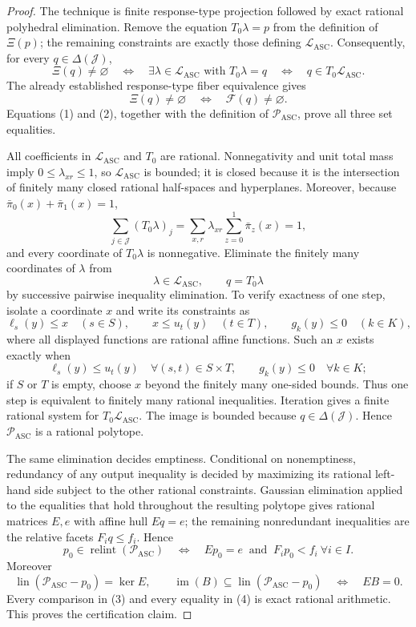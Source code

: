 \documentclass{article}
\begin{document}
\begin{proof}
The technique is finite response-type projection followed by exact rational polyhedral elimination.  Remove the equation \(T_0\lambda=p\) from the definition of \(\Xi(p)\); the remaining constraints are exactly those defining \(\mathcal L_{\mathrm{ASC}}\).  Consequently, for every \(q\in\Delta(\mathcal J)\),
\[
 \Xi(q)\ne\varnothing
 \quad\Longleftrightarrow\quad
 \exists\lambda\in\mathcal L_{\mathrm{ASC}}\text{ with }T_0\lambda=q
 \quad\Longleftrightarrow\quad
 q\in T_0\mathcal L_{\mathrm{ASC}}. \tag{1}
\]
The already established response-type fiber equivalence gives
\[
 \Xi(q)\ne\varnothing
 \quad\Longleftrightarrow\quad
 \mathcal F(q)\ne\varnothing. \tag{2}
\]
Equations (1) and (2), together with the definition of \(\mathcal P_{\mathrm{ASC}}\), prove all three set equalities.

All coefficients in \(\mathcal L_{\mathrm{ASC}}\) and \(T_0\) are rational.  Nonnegativity and unit total mass imply \(0\le\lambda_{xr}\le1\), so \(\mathcal L_{\mathrm{ASC}}\) is bounded; it is closed because it is the intersection of finitely many closed rational half-spaces and hyperplanes.  Moreover, because \(\bar\pi_0(x)+\bar\pi_1(x)=1\),
\[
 \sum_{j\in\mathcal J}(T_0\lambda)_j
 =\sum_{x,r}\lambda_{xr}\sum_{z=0}^1\bar\pi_z(x)=1,
\]
and every coordinate of \(T_0\lambda\) is nonnegative.  Eliminate the finitely many coordinates of \(\lambda\) from
\[
 \lambda\in\mathcal L_{\mathrm{ASC}},\qquad q=T_0\lambda
\]
by successive pairwise inequality elimination.  To verify exactness of one step, isolate a coordinate \(x\) and write its constraints as
\[
 \ell_s(y)\le x\quad(s\in S),\qquad
 x\le u_t(y)\quad(t\in T),\qquad
 g_k(y)\le0\quad(k\in K),
\]
where all displayed functions are rational affine functions.  Such an \(x\) exists exactly when
\[
 \ell_s(y)\le u_t(y)\quad\forall(s,t)\in S\times T,
 \qquad g_k(y)\le0\quad\forall k\in K;
\]
if \(S\) or \(T\) is empty, choose \(x\) beyond the finitely many one-sided bounds.  Thus one step is equivalent to finitely many rational inequalities.  Iteration gives a finite rational system for \(T_0\mathcal L_{\mathrm{ASC}}\).  The image is bounded because \(q\in\Delta(\mathcal J)\).  Hence \(\mathcal P_{\mathrm{ASC}}\) is a rational polytope.

The same elimination decides emptiness.  Conditional on nonemptiness, redundancy of any output inequality is decided by maximizing its rational left-hand side subject to the other rational constraints.  Gaussian elimination applied to the equalities that hold throughout the resulting polytope gives rational matrices \(E,e\) with affine hull \(Eq=e\); the remaining nonredundant inequalities are the relative facets \(F_iq\le f_i\).  Hence
\[
 p_0\in\operatorname{relint}(\mathcal P_{\mathrm{ASC}})
 \quad\Longleftrightarrow\quad
 Ep_0=e\ \text{ and }\ F_ip_0<f_i\ \forall i\in I. \tag{3}
\]
Moreover
\[
 \operatorname{lin}(\mathcal P_{\mathrm{ASC}}-p_0)=\ker E,
 \qquad
 \operatorname{im}(B)\subseteq\operatorname{lin}(\mathcal P_{\mathrm{ASC}}-p_0)
 \quad\Longleftrightarrow\quad EB=0. \tag{4}
\]
Every comparison in (3) and every equality in (4) is exact rational arithmetic.  This proves the certification claim.
\end{proof}
\end{document}
